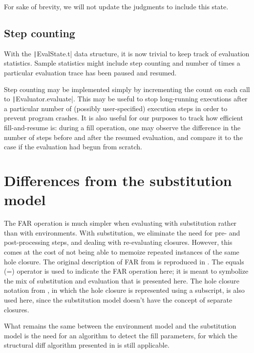 For sake of brevity, we will not update the judgments to include this state.

\subsection{Step counting}
\label{sec:step-counting}

With the \texttt|EvalState.t| data structure, it is now trivial to keep track of evaluation statistics. Sample statistics might include step counting and number of times a particular evaluation trace has been paused and resumed.

Step counting may be implemented simply by incrementing the count on each call to \texttt|Evaluator.evaluate|. This may be useful to stop long-running executions after a particular number of (possibly user-specified) execution steps in order to prevent program crashes. It is also useful for our purposes to track how efficient fill-and-resume is: during a fill operation, one may observe the difference in the number of steps before and after the resumed evaluation, and compare it to the case if the evaluation had begun from scratch.

\section{Differences from the substitution model}
\label{sec:far-sub}

The FAR operation is much simpler when evaluating with substitution rather than with environments. With substitution, we eliminate the need for pre- and post-processing steps, and dealing with re-evaluating closures. However, this comes at the cost of not being able to memoize repeated instances of the same hole closure. The original description of FAR from \cite{conf/popl/HazelnutLive19} is reproduced in . The equals (=) operator is used to indicate the FAR operation here; it is meant to symbolize the mix of substitution and evaluation that is presented here. The hole closure notation from \cite{conf/popl/HazelnutLive19}, in which the hole closure is represented using a subscript, is also used here, since the substitution model doesn't have the concept of separate closures.

What remains the same between the environment model and the substitution model is the need for an algorithm to detect the fill parameters, for which the structural diff algorithm presented in  is still applicable.


